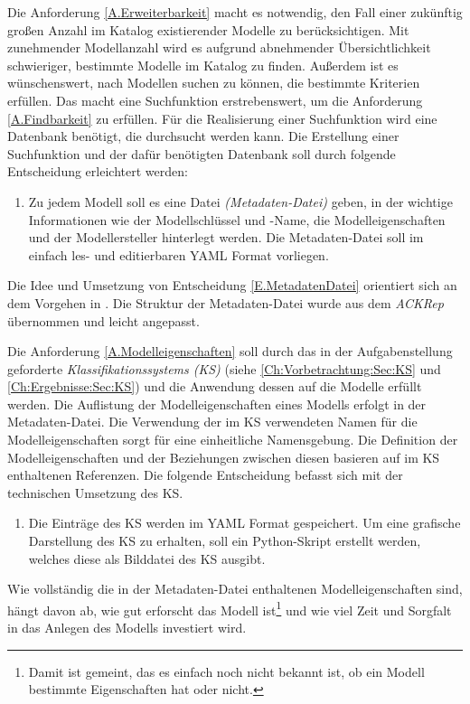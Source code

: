 Die Anforderung \ref{A.Erweiterbarkeit} macht es notwendig, den Fall einer zukünftig großen Anzahl im Katalog existierender Modelle zu berücksichtigen. Mit zunehmender Modellanzahl wird es aufgrund abnehmender Übersichtlichkeit schwieriger, bestimmte Modelle im Katalog zu finden. Außerdem ist es wünschenswert, nach Modellen suchen zu können, die bestimmte Kriterien erfüllen. Das macht eine Suchfunktion erstrebenswert,  um die Anforderung \ref{A.Findbarkeit} zu erfüllen. Für die Realisierung einer Suchfunktion wird eine Datenbank benötigt, die durchsucht werden kann. Die Erstellung einer Suchfunktion und der dafür benötigten Datenbank soll durch folgende Entscheidung erleichtert werden:
\begin{enumerate}[label=\textbf{Entscheidung E.\arabic*}:, ref=\textbf{E.\arabic*}, wide=0pt, leftmargin=*]
	\item \label{E.MetadatenDatei}Zu jedem Modell soll es eine Datei \textit{(Metadaten-Datei)} geben, in der wichtige Informationen wie der Modellschlüssel und -Name, die Modelleigenschaften und der Modellersteller hinterlegt werden. Die Metadaten-Datei soll im einfach les- und editierbaren YAML Format vorliegen.
\end{enumerate}
Die Idee und Umsetzung von Entscheidung \ref{E.MetadatenDatei} orientiert sich an dem Vorgehen in \cite{KNHE20a}. Die Struktur der Metadaten-Datei wurde aus dem \textit{ACKRep} übernommen und leicht angepasst.

Die Anforderung \ref{A.Modelleigenschaften} soll durch das in der Aufgabenstellung geforderte \textit{Klassifikationssystems (KS)} (siehe \autoref{Ch:Vorbetrachtung:Sec:KS} und \autoref{Ch:Ergebnisse:Sec:KS}) und die Anwendung dessen auf die Modelle erfüllt werden. Die Auflistung der Modelleigenschaften eines Modells erfolgt in der Metadaten-Datei. Die Verwendung der im KS verwendeten Namen für die Modelleigenschaften sorgt für eine einheitliche Namensgebung. Die Definition der Modelleigenschaften und der Beziehungen zwischen diesen basieren auf im KS enthaltenen Referenzen. Die folgende Entscheidung befasst sich mit der technischen Umsetzung des KS.
\begin{enumerate}[resume*]
	\item \label{E.KS_TechUmsetzung}Die Einträge des KS werden im YAML Format gespeichert. Um eine grafische Darstellung des KS zu erhalten, soll ein Python-Skript erstellt werden, welches diese als Bilddatei des KS ausgibt.
\end{enumerate}
Wie vollständig die in der Metadaten-Datei enthaltenen Modelleigenschaften sind, hängt davon ab, wie gut erforscht das Modell ist\footnote{Damit ist gemeint, das es einfach noch nicht bekannt ist, ob ein Modell bestimmte Eigenschaften hat oder nicht.} und wie viel Zeit und Sorgfalt in das Anlegen des Modells investiert wird. %


